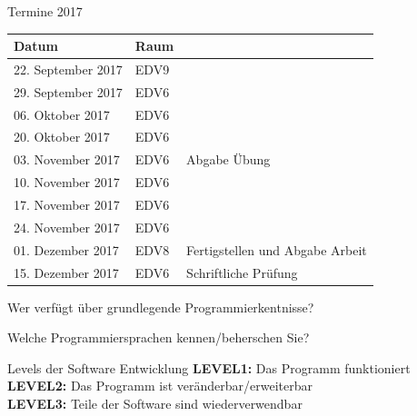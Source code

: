 \documentclass{beamer}
\begin{document}
\begin{frame}{Termine 2017}
\begin{table}
\begin{tabular}{l | l | l }
Datum & Raum \\
\hline
22. September 2017 & EDV9 \\
29. September 2017 & EDV6 \\
06. Oktober 2017 & EDV6 \\
20. Oktober 2017 & EDV6 \\
03. November 2017 & EDV6 & Abgabe Übung\\
10. November 2017 & EDV6 \\
17. November 2017 & EDV6 \\
24. November 2017 & EDV6 \\
01. Dezember 2017 & EDV8 & Fertigstellen und Abgabe Arbeit\\
15. Dezember 2017 & EDV6 & Schriftliche Prüfung
\end{tabular}
\end{table}
\end{frame}


\begin{frame}
Wer verfügt über grundlegende Programmierkentnisse?
\end{frame}

\begin{frame}
Welche Programmiersprachen kennen/beherschen Sie?
\end{frame}

\begin{frame}{Levels der Software Entwicklung}
\textbf{LEVEL1:} Das Programm funktioniert \\
\textbf{LEVEL2:} Das Programm ist veränderbar/erweiterbar \\
\textbf{LEVEL3:} Teile der Software sind wiederverwendbar
\end{frame}
\end{document}
